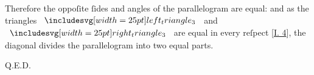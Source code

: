 \documentclass[11pt,preview]{standalone}
\begin{document}
\raggedright Therefore the oppoſite ſides and angles of the parallelogram are equal: and as the triangles $\img{left_triangle_3}$ and $\img{right_triangle_3}$ are equal in every reſpect \hspace{0ex} [\hyperref[book1pr4]{\textsc{I.} 4}], the diagonal divides the parallelogram into two equal parts.

\hfill

\hfill Q.E.D.
\end{document}
